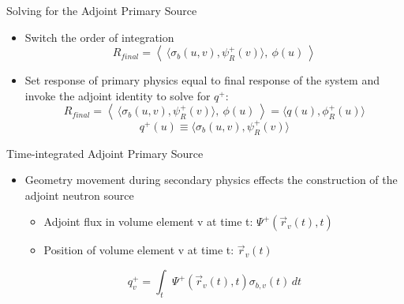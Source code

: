 \documentclass{beamer}
\begin{document}
\begin{frame}{Solving for the Adjoint Primary Source}
\begin{itemize}
	\item{Switch the order of integration}
\begin{equation}\label{eq:pseudo-response}
  R_{final} = \left \langle \ \langle \sigma_b(u,v) , \psi_R^{+}(v) \rangle,\
	\phi(u) \ \right\rangle
\end{equation}
\item{Set response of primary physics equal to final response of the system and
	invoke the adjoint identity to solve for $q^+$:}
\begin{equation}
  R_{final} = \left \langle \ \langle \sigma_b(u,v) , \psi_R^{+}(v) \rangle,\
	\phi(u) \ \right\rangle = \langle q(u), \phi_R^{+}(u) \rangle
\end{equation}
\begin{equation}
  q^{+}(u) \equiv \langle \sigma_b(u,v) , \psi_R^{+}(v) \rangle
\end{equation}
\end{itemize}
\end{frame}

\begin{frame}{Time-integrated Adjoint Primary Source}
	\begin{itemize}
	\item{Geometry movement during secondary physics effects the
			construction of the adjoint neutron source}
	   \begin{itemize}
	   \item	{Adjoint flux in volume element v at time t: 
	   	$\Psi^{+}(\overrightarrow{r}_{v}(t), t)$ }
	   \item  {Position of volume element v at time t:
	   	$\overrightarrow{r}_{v}(t)$ }
	   \end{itemize}
        \begin{equation}\label{eq:adj_src_1_avg}
       	 q_{v}^{+} =
       	 \int_{t}  \Psi^{+}(\overrightarrow{r}_{v}(t), t)
       	 \sigma_{b,v}(t)\, dt
        \end{equation}
	\end{itemize}


	\begin{center}
	\end{center}
\end{frame}
\end{document}

